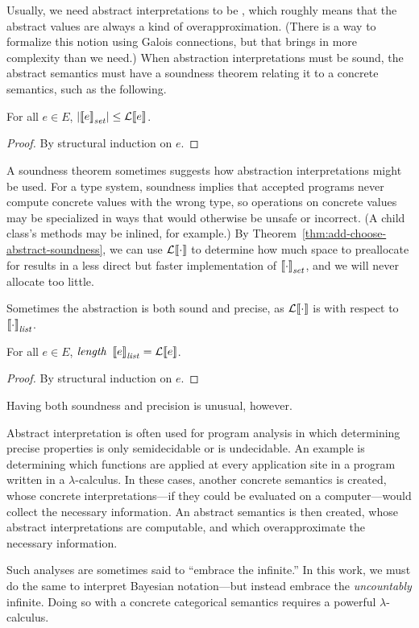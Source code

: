Usually, we need abstract interpretations to be , which roughly means that the abstract values are always a kind of overapproximation.
(There is a way to formalize this notion using Galois connections, but that brings in more complexity than we need.)
When abstraction interpretations must be sound, the abstract semantics must have a soundness theorem relating it to a concrete semantics, such as the following.

\begin{theorem}
\label{thm:add-choose-abstract-soundness}
For all $e \in E$, $\left|\left\llbracket{e}\right\rrbracket_\mathit{set}\right| \leq \mathcal{L}\!\left\llbracket{e}\right\rrbracket$.
\end{theorem}
\begin{proof}
By structural induction on $e$.
\end{proof}

A soundness theorem sometimes suggests how abstraction interpretations might be used.
For a type system, soundness implies that accepted programs never compute concrete values with the wrong type, so operations on concrete values may be specialized in ways that would otherwise be unsafe or incorrect.
(A child class's methods may be inlined, for example.)
By Theorem~\ref{thm:add-choose-abstract-soundness}, we can use $\mathcal{L}\!\left\llbracket{\cdot}\right\rrbracket$ to determine how much space to preallocate for results in a less direct but faster implementation of $\left\llbracket{\cdot}\right\rrbracket_\mathit{set}$, and we will never allocate too little.

Sometimes the abstraction is both sound and precise, as $\mathcal{L}\!\left\llbracket{\cdot}\right\rrbracket$ is with respect to $\left\llbracket{\cdot}\right\rrbracket_\mathit{list}$.

\begin{theorem}
For all $e \in E$, $\mathit{length}~\left\llbracket{e}\right\rrbracket_\mathit{list} = \mathcal{L}\!\left\llbracket{e}\right\rrbracket$.
\end{theorem}
\begin{proof}
By structural induction on $e$.
\end{proof}

Having both soundness and precision is unusual, however.

Abstract interpretation is often used for program analysis in which determining precise properties is only semidecidable or is undecidable.
An example is determining which functions are applied at every application site in a program written in a $\lambda$-calculus.
In these cases, another concrete semantics is created, whose concrete interpretations---if they could be evaluated on a computer---would collect the necessary information.
An abstract semantics is then created, whose abstract interpretations are computable, and which overapproximate the necessary information.

Such analyses are sometimes said to ``embrace the infinite.''
In this work, we must do the same to interpret Bayesian notation---but instead embrace the \emph{uncountably} infinite.
Doing so with a concrete categorical semantics requires a powerful $\lambda$-calculus.
